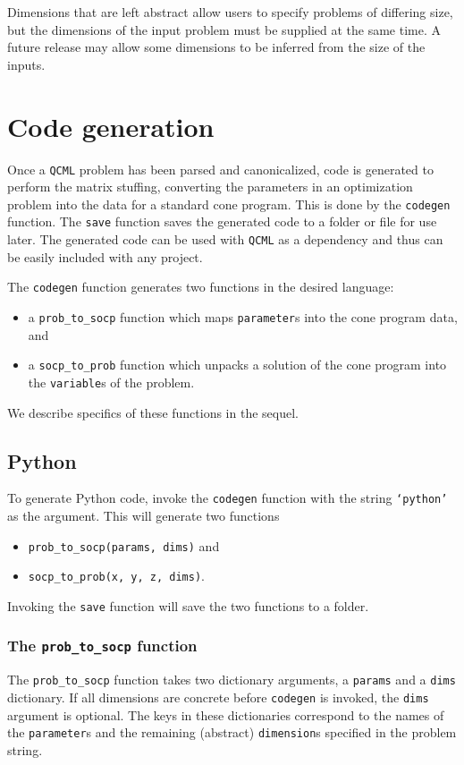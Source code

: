 \documentclass[11pt]{article}
\def\qcml{\texttt{QCML}\xspace}
\begin{document}
Dimensions that are left abstract allow users to specify problems of
differing size, but the dimensions of the input problem must be supplied at
the same time. A future release may allow some dimensions to be inferred from
the size of the inputs.

\section{Code generation}
\label{s-ug-codegen}
Once a \qcml problem has been parsed and canonicalized, code is generated
to perform the matrix stuffing, converting the parameters in an optimization
problem into the data for a standard cone program. This is done by the
{\tt codegen} function. The {\tt save} function saves the generated code to
a folder or file for use later. The generated code can be used with \qcml as
a dependency and thus can be easily included with any project.

The {\tt codegen} function generates two functions in the desired language:
\begin{itemize}
\item a {\tt prob\_to\_socp} function which maps {\tt parameter}s into the cone
program data, and
\item a {\tt socp\_to\_prob} function which unpacks a solution of the cone program
into the {\tt variable}s of the problem.
\end{itemize}
We describe specifics of these functions in the sequel.

\subsection{Python}
To generate Python code, invoke the {\tt codegen} function with the string
{\tt `python'} as the argument. This will generate two functions
\begin{itemize}
\item {\tt prob\_to\_socp(params, dims)} and
\item {\tt socp\_to\_prob(x, y, z, dims)}.
\end{itemize}
Invoking the {\tt save} function will save the two functions to a folder.

\subsubsection{The {\tt prob\_to\_socp} function}
The {\tt prob\_to\_socp} function takes two dictionary
arguments, a {\tt params} and a {\tt dims} dictionary. If all dimensions are
concrete before {\tt codegen} is invoked, the {\tt dims} argument is optional.
The keys in these
dictionaries correspond to the names of the {\tt parameter}s and the
remaining (abstract)
{\tt dimension}s specified in the problem string.
\end{document}
